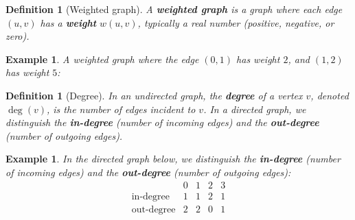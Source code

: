\documentclass[11pt,a4paper]{article}
\newtheorem{definition}[theorem]{Definition}
\newtheorem{example}[theorem]{Example}
\begin{document}
\begin{definition}[Weighted graph]
A \textbf{weighted graph} is a graph where each edge $(u, v)$ has a \textbf{weight} $w(u, v)$, typically a real number (positive, negative, or zero).
\end{definition}

\begin{example}
A weighted graph where the edge $(0, 1)$ has weight $2$, and $(1, 2)$ has weight $5$:
\begin{center}
\end{center}
\end{example}

\begin{definition}[Degree]
In an undirected graph, the \textbf{degree} of a vertex $v$, denoted $\deg(v)$, is the number of edges incident to $v$. In a directed graph, we distinguish the \textbf{in-degree} (number of incoming edges) and the \textbf{out-degree} (number of outgoing edges).
\end{definition}

\begin{example}
In the directed graph below, we distinguish the \textbf{in-degree} (number of incoming edges) and the \textbf{out-degree} (number of outgoing edges):
\[
\begin{array}{c|cccc}
 & 0 & 1 & 2 & 3 \\
\hline
\text{in-degree} & 1 & 1 & 2 & 1 \\
\text{out-degree} & 2 & 2 & 0 & 1 \\
\end{array}
\]
\begin{center}
\end{center}
\end{example}
\end{document}
